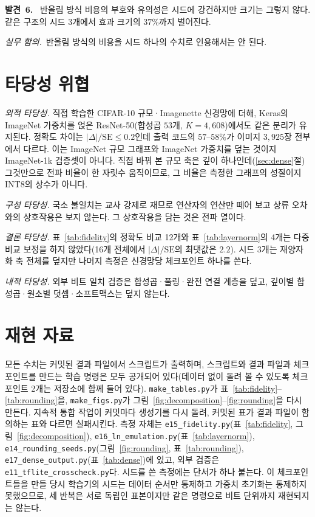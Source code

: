 \documentclass[journal]{IEEEtran}
\newcommand{\finding}[1]{\smallskip\noindent\textbf{발견~#1.}~}
\newcommand{\implication}{\emph{실무 함의.}~}
\begin{document}
\finding{6} 반올림 방식 비용의 부호와 유의성은 시드에 강건하지만 크기는 그렇지 않다. 같은 구조의 시드 3개에서
효과 크기의 $37\%$까지 벌어진다.

\implication 반올림 방식의 비용을 시드 하나의 수치로 인용해서는 안 된다.

\section{타당성 위협}
\emph{외적 타당성.} 직접 학습한 CIFAR-10 규모·Imagenette 신경망에 더해, Keras의 ImageNet 가중치를 얹은
ResNet-50(합성곱 $53$개, $K = 4{,}608$)에서도 같은 분리가 유지된다. 정확도 차이는
$|\Delta|/\mathrm{SE} \le 0.2$인데 출력 코드의 $57$--$58\%$가 이미지 $3{,}925$장 전부에서 다르다. 이는
ImageNet 규모 그래프와 ImageNet 가중치를 덮는 것이지 ImageNet-1k 검증셋이 아니다. 직접 바꿔 본 규모 축은
깊이 하나인데(\ref{sec:dense}절) 그것만으로 전파 비율이 한 자릿수 움직이므로, 그 비율은 측정한 그래프의
성질이지 INT8의 상수가 아니다.

\emph{구성 타당성.} 국소 불일치는 교사 강제로 재므로 연산자의 연산만 떼어 보고 상류 오차와의 상호작용은 보지
않는다. 그 상호작용을 담는 것은 전파 열이다.

\emph{결론 타당성.} 표~\ref{tab:fidelity}의 정확도 비교 12개와 표~\ref{tab:layernorm}의 4개는 다중비교 보정을
하지 않았다(16개 전체에서 $|\Delta|/\mathrm{SE}$의 최댓값은 $2.2$). 시드 3개는 재양자화 축 전체를 덮지만
나머지 측정은 신경망당 체크포인트 하나를 쓴다.

\emph{내적 타당성.} 외부 비트 일치 검증은 합성곱·풀링·완전 연결 계층을 덮고, 깊이별 합성곱·원소별
덧셈·소프트맥스는 덮지 않는다.

\section{재현 자료}
모든 수치는 커밋된 결과 파일에서 스크립트가 출력하며, 스크립트와 결과 파일과 체크포인트를 만드는 학습 명령은 모두
공개되어 있다(데이터 없이 돌려 볼 수 있도록 체크포인트 2개는 저장소에 함께 들어 있다). \texttt{make\_tables.py}가 표~\ref{tab:fidelity}--\ref{tab:rounding}을, \texttt{make\_figs.py}가
그림~\ref{fig:decomposition}--\ref{fig:rounding}을 다시 만든다. 지속적 통합 작업이 커밋마다 생성기를 다시 돌려,
커밋된 표가 결과 파일이 함의하는 표와 다르면 실패시킨다. 측정 자체는 \texttt{e15\_fidelity.py}(표~\ref{tab:fidelity},
그림~\ref{fig:decomposition}), \texttt{e16\_ln\_emulation.py}(표~\ref{tab:layernorm}),
\texttt{e14\_rounding\_seeds.py}(그림~\ref{fig:rounding}, 표~\ref{tab:rounding}),
\texttt{e17\_dense\_output.py}(표~\ref{tab:dense})에 있고, 외부 검증은 \texttt{e11\_tflite\_crosscheck.py}다. 시드를 쓴 측정에는 단서가 하나 붙는다. 이 체크포인트들을 만들 당시 학습기의
시드는 데이터 순서만 통제하고 가중치 초기화는 통제하지 못했으므로, 세 반복은 서로 독립인 표본이지만 같은 명령으로
비트 단위까지 재현되지는 않는다.
\end{document}
